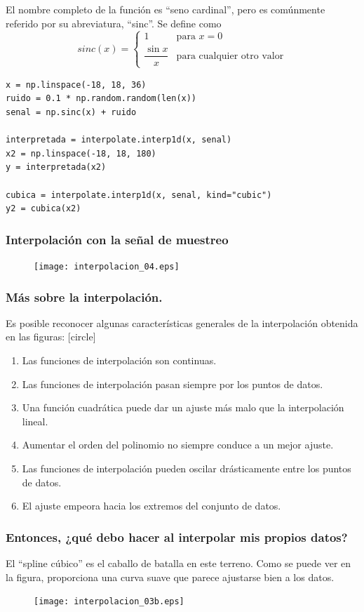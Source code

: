 \begin{frame}
El nombre completo de la función es ``seno cardinal'', pero es comúnmente referido por su abreviatura, ``sinc''. Se define como
\[ sinc(x) = \begin{cases}
1 & \mbox{para } x = 0 \\
\dfrac{\sin x}{x} & \mbox{para cualquier otro valor} \end{cases}\]
\end{frame}
\begin{frame}[fragile]
\begin{lstlisting}[basicstyle=\ttfamily\normalsize, columns=fullflexible]
x = np.linspace(-18, 18, 36)
ruido = 0.1 * np.random.random(len(x))
senal = np.sinc(x) + ruido

interpretada = interpolate.interp1d(x, senal)
x2 = np.linspace(-18, 18, 180)
y = interpretada(x2)

cubica = interpolate.interp1d(x, senal, kind="cubic")
y2 = cubica(x2)
\end{lstlisting}
\end{frame}
\begin{frame}
\frametitle{Interpolación con la señal de muestreo}
\begin{figure}
\texttt{[image: interpolacion\_04.eps]}
\end{figure}
\end{frame}
\begin{frame}
\frametitle{Más sobre la interpolación.}
Es posible reconocer algunas características generales de la interpolación obtenida en las figuras:
[circle]
\begin{enumerate}[<+->]
\item Las funciones de interpolación son continuas.
\item Las funciones de interpolación pasan siempre por los puntos de datos.
\item Una función cuadrática puede dar un ajuste más malo que la interpolación lineal.
\item Aumentar el orden del polinomio no siempre conduce a un mejor ajuste.
\item Las funciones de interpolación pueden oscilar drásticamente entre los puntos de datos.
\item El ajuste empeora hacia los extremos del conjunto de datos.
\end{enumerate}
\end{frame}
\begin{frame}
\frametitle{Entonces, ¿qué debo hacer al interpolar mis propios datos?}
El ``spline cúbico'' es el caballo de batalla en este terreno. Como se puede ver en la figura, proporciona una curva suave que parece ajustarse bien a los datos.
\begin{figure}
\centering
\texttt{[image: interpolacion\_03b.eps]}
\end{figure}
\end{frame}
